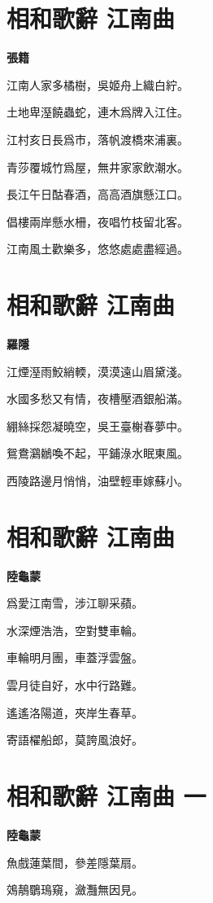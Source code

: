 \documentclass[12pt,a4paper]{ctexbook}
\begin{document}
\section{相和歌辭 江南曲}
\textbf{張籍}\par\vspace{0.5em}
江南人家多橘樹，吳姬舟上織白紵。\par
土地卑溼饒蟲蛇，連木爲牌入江住。\par
江村亥日長爲市，落帆渡橋來浦裏。\par
青莎覆城竹爲屋，無井家家飲潮水。\par
長江午日酤春酒，高高酒旗懸江口。\par
倡樓兩岸懸水柵，夜唱竹枝留北客。\par
江南風土歡樂多，悠悠處處盡經過。\par

\section{相和歌辭 江南曲}
\textbf{羅隱}\par\vspace{0.5em}
江煙溼雨鮫綃輭，漠漠遠山眉黛淺。\par
水國多愁又有情，夜槽壓酒銀船滿。\par
綳絲採怨凝曉空，吳王臺榭春夢中。\par
鴛鴦鸂鶒喚不起，平鋪淥水眠東風。\par
西陵路邊月悄悄，油壁輕車嫁蘇小。\par

\section{相和歌辭 江南曲}
\textbf{陸龜蒙}\par\vspace{0.5em}
爲愛江南雪，涉江聊采蘋。\par
水深煙浩浩，空對雙車輪。\par
車輪明月團，車蓋浮雲盤。\par
雲月徒自好，水中行路難。\par
遙遙洛陽道，夾岸生春草。\par
寄語櫂船郎，莫誇風浪好。\par

\section{相和歌辭 江南曲 一}
\textbf{陸龜蒙}\par\vspace{0.5em}
魚戲蓮葉間，參差隱葉扇。\par
鵁鶄鸀鳿窺，瀲灩無因見。\par
\end{document}
